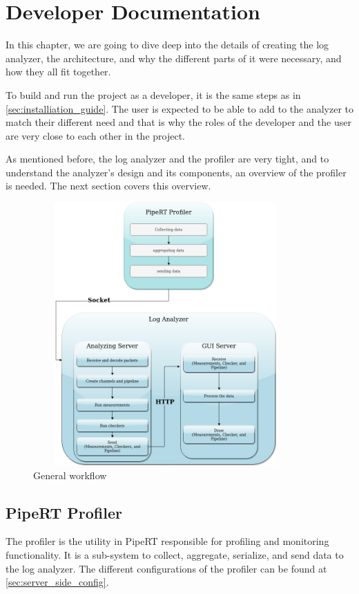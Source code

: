 \chapter{Developer Documentation} %
\label{ch:impl}

In this chapter, we are going to dive deep into the details of creating the log analyzer,
the architecture, and why the different parts of it were necessary, and how they all fit together.

To build and run the project as a developer, it is the same steps as in \ref{sec:installiation_guide}.
The user is expected to be able to add to the analyzer to match their different need and that is why
the roles of the developer and the user are very close to each other in the project.

As mentioned before, the log analyzer and the profiler are very tight, and to understand the analyzer's
design and its components, an overview of the profiler is needed. The next section covers this overview.
\newline
\begin{figure}[H]
	\centering
	\includegraphics[width=0.9\textwidth,height=380px]{images/general_work_flow.jpg}
	\caption{General workflow}
	\label{fig:general_work_flow}
\end{figure}

\section{PipeRT Profiler}\label{sec:profiler}
The profiler is the utility in PipeRT responsible for profiling and monitoring functionality. It is a
sub-system to collect, aggregate, serialize, and send data to the log analyzer. The different configurations
of the profiler can be found at \ref{sec:server_side_config}.

